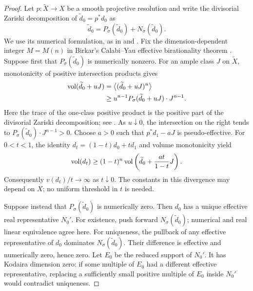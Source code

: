 \begin{proof}
Let $p:\widetilde X\to X$ be a smooth projective resolution and write
the divisorial Zariski decomposition of
$\widetilde d_0=p^*d_0$ as
\[
 \widetilde d_0=P_\sigma(\widetilde d_0)
                      +N_\sigma(\widetilde d_0).
\]
We use its numerical formulation, as in
\citep[Chapter~III]{Nakayama2004} and \citep{Boucksom2004}.
Fix the dimension-dependent integer $M=M(n)$ in Birkar's
Calabi--Yau effective birationality theorem
\citep[Corollary~1.4]{Birkar2023}.
Suppose first that $P_\sigma(\widetilde d_0)$ is numerically nonzero.
For an ample class $J$ on $\widetilde X$, monotonicity of positive
intersection products gives
\begin{align*}
 \operatorname{vol}(\widetilde d_0+uJ)
 &=\bigl\langle(\widetilde d_0+uJ)^n\bigr\rangle\\
 &\ge u^{n-1}
 P_\sigma(\widetilde d_0+uJ)\cdot J^{n-1}.
\end{align*}
Here the trace of the one-class positive product is the positive
part of the divisorial Zariski decomposition; see
\citep[Definition~2.10, Proposition~2.13, Theorem~3.1, and
Section~3.4]{BFJ2009}.
As $u\downarrow0$, the intersection on the right tends to
$P_\sigma(\widetilde d_0)\cdot J^{n-1}>0$.
Choose $a>0$ such that $p^*d_1-aJ$ is pseudo-effective.  For
$0<t<1$, the identity
$d_t=(1-t)d_0+td_1$ and volume monotonicity yield
\[
 \operatorname{vol}(d_t)\ge(1-t)^n
 \operatorname{vol}\left(\widetilde d_0+\frac{at}{1-t}J\right).
\]
Consequently $v(d_t)/t\to\infty$ as $t\downarrow0$.
The constants in this divergence may depend on $X$; no uniform
threshold in $t$ is needed.

Suppose instead that $P_\sigma(\widetilde d_0)$ is numerically zero.
Then $d_0$ has a unique effective real representative $N_0'$.
For existence, push forward $N_\sigma(\widetilde d_0)$; numerical
and real linear equivalence agree here.  For uniqueness, the pullback
of any effective representative of $d_0$ dominates
$N_\sigma(\widetilde d_0)$.  Their difference is effective and
numerically zero, hence zero.  Let $E_0$ be the reduced support of
$N_0'$.  It has Kodaira dimension zero: if some multiple of $E_0$ had
a different effective representative, replacing a sufficiently small
positive multiple of $E_0$ inside $N_0'$ would contradict uniqueness.


\end{proof}
